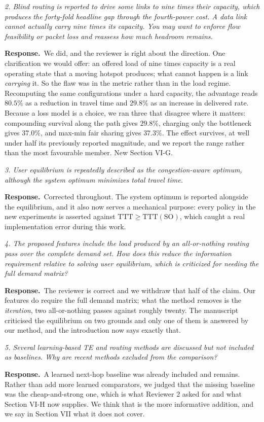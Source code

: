 \documentclass[11pt]{article}
\newcommand{\rc}[1]{\medskip\noindent\textit{\textcolor{black!65}{#1}}\par\smallskip}
\newcommand{\ans}{\noindent\textbf{Response.}\ }
\begin{document}
\rc{2. Blind routing is reported to drive some links to nine times their capacity, which produces
the forty-fold headline gap through the fourth-power cost. A data link cannot actually carry nine
times its capacity. You may want to enforce flow feasibility or packet loss and reassess how much
headroom remains.}
\ans We did, and the reviewer is right about the direction. One clarification we would offer: an
offered load of nine times capacity is a real operating state that a moving hotspot produces; what
cannot happen is a link \emph{carrying} it. So the flaw was in the metric rather than in the load
regime. Recomputing the same configurations under a hard capacity, the advantage reads $80.5\%$ as
a reduction in travel time and $29.8\%$ as an increase in delivered rate. Because a loss model is a
choice, we ran three that disagree where it matters: compounding survival along the path gives
$29.8\%$, charging only the bottleneck gives $37.0\%$, and max-min fair sharing gives $37.3\%$. The
effect survives, at well under half its previously reported magnitude, and we report the range
rather than the most favourable member. New Section VI-G.

\rc{3. User equilibrium is repeatedly described as the congestion-aware optimum, although the
system optimum minimizes total travel time.}
\ans Corrected throughout. The system optimum is reported alongside the equilibrium, and it also
now serves a mechanical purpose: every policy in the new experiments is asserted against
$\mathrm{TTT} \ge \mathrm{TTT(SO)}$, which caught a real implementation error during this work.

\rc{4. The proposed features include the load produced by an all-or-nothing routing pass over the
complete demand set. How does this reduce the information requirement relative to solving user
equilibrium, which is criticized for needing the full demand matrix?}
\ans The reviewer is correct and we withdraw that half of the claim. Our features do require the
full demand matrix; what the method removes is the \emph{iteration}, two all-or-nothing passes
against roughly twenty. The manuscript criticised the equilibrium on two grounds and only one of
them is answered by our method, and the introduction now says exactly that.

\rc{5. Several learning-based TE and routing methods are discussed but not included as baselines.
Why are recent methods excluded from the comparison?}
\ans A learned next-hop baseline was already included and remains. Rather than add more learned
comparators, we judged that the missing baseline was the cheap-and-strong one, which is what
Reviewer 2 asked for and what Section VI-H now supplies. We think that is the more informative
addition, and we say in Section VII what it does not cover.
\end{document}
